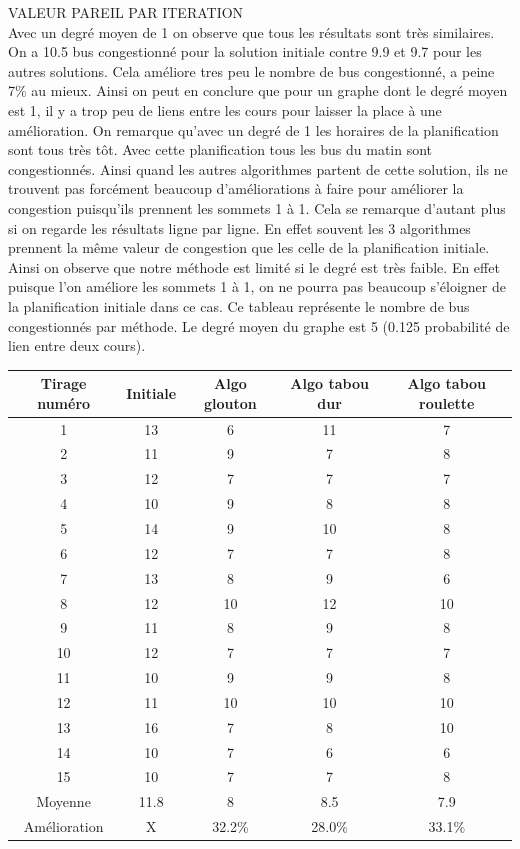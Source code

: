 \documentclass[a4paper,11pt]{article}
\begin{document}
	VALEUR PAREIL PAR ITERATION\\
	Avec un degré moyen de 1 on observe que tous les résultats sont très similaires. On a 10.5 bus congestionné pour la solution initiale contre 9.9 et 9.7 pour les autres solutions. Cela améliore tres peu le nombre de bus congestionné, a peine 7\% au mieux. Ainsi on peut en conclure que pour un graphe dont le degré moyen est 1, il y a trop peu de liens entre les cours pour laisser la place à une amélioration. On remarque qu'avec un degré de 1 les horaires de la planification sont tous très tôt. Avec cette planification tous les bus du matin sont congestionnés. Ainsi quand les autres algorithmes partent de cette solution, ils ne trouvent pas forcément beaucoup d'améliorations à faire pour améliorer la congestion puisqu'ils prennent les sommets 1 à 1. Cela se remarque d'autant plus si on regarde les résultats ligne par ligne. En effet souvent les 3 algorithmes prennent la même valeur de congestion que les celle de la planification initiale. Ainsi on observe que notre méthode est limité si le degré est très faible. En effet puisque l'on améliore les sommets 1 à 1, on ne pourra pas beaucoup s'éloigner de la planification initiale dans ce cas.
	\newpage
	Ce tableau représente le nombre de bus congestionnés par méthode. Le degré moyen du graphe est 5 (0.125 probabilité de lien entre deux cours).\\ 
	\begin{tabular}{|c|c|c|c|c|}
  		\hline
  		Tirage numéro & Initiale & Algo glouton & Algo tabou dur & Algo tabou roulette\\
  		\hline
  		1 & 13 & 6 & 11 & 7\\
  		\hline
  		2 & 11 & 9 & 7 & 8\\
  		\hline
  		3 & 12 & 7 & 7 & 7\\
  		\hline
  		4 & 10 & 9 & 8 & 8\\
  		\hline
  		5 & 14 & 9 & 10 & 8\\
  		\hline
  		6 & 12 & 7 & 7 & 8\\
  		\hline
  		7 & 13 & 8 & 9 & 6\\
  		\hline
  		8 & 12 & 10 & 12 & 10\\
  		\hline
  		9 & 11 & 8 & 9 & 8\\
  		\hline
  		10 & 12 & 7 & 7 & 7\\
  		\hline
  		11 & 10 & 9 & 9 & 8\\
  		\hline
  		12 & 11 & 10 & 10 & 10\\
  		\hline
  		13 & 16 & 7 & 8 & 10\\
  		\hline
  		14 & 10 & 7 & 6 & 6\\
  		\hline
  		15 & 10 & 7 & 7 & 8\\
  		\hline
  		Moyenne & 11.8 & 8 & 8.5 & 7.9\\
  		\hline
  		Amélioration & X & 32.2\% & 28.0\% & 33.1\%\\
  		\hline
	\end{tabular}
\end{document}
